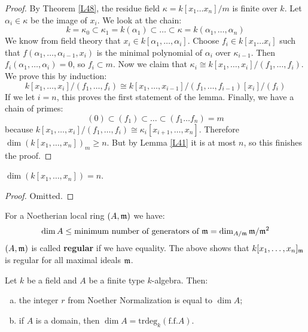 \documentclass{../mathnotes}
\begin{document}
\begin{proof}
By Theorem \ref{L48}, the residue field $\kappa = k[x_1 \dots x_n]/m$ is finite over $k$. Let $\alpha_i \in \kappa$ be the image of $x_i$. We look at the chain:
\[        k = \kappa_0 \subset \kappa_1 = k(\alpha_1) \subset \dots \subset \kappa = k(\alpha_1, \dots , \alpha_n)        \]
We know from field theory that $x_i \in k[\alpha_1, \dots, \alpha_i]$. Choose $f_i \in k[x_1 \dots x_i]$ such that $f(\alpha_1, \dots, \alpha_{i-1}, x_i)$ is the minimal polynomial of $\alpha_i$ over $\kappa_{i-1}$. Then $f_i(\alpha_1, \dots, \alpha_i) = 0$, so $f_i \subset m$. Now we claim that $\kappa_i \cong k[x_1, \dots, x_i]/(f_1, \dots, f_i)$. We prove this by induction:
\[       k[x_1, \dots, x_i]/(f_1, \dots, f_i)   \cong k[x_1, \dots, x_{i-1}]/(f_1, \dots, f_{i-1}) [x_i] /(f_i)        \]
If we let $i=n$, this proves the first statement of the lemma. Finally, we have a chain of primes:
\[      (0) \subset (f_1) \subset \dots \subset (f_1 \dots f_n) = m        \]
because $ k[x_1, \dots, x_i]/(f_1, \dots, f_i) \cong \kappa_i [x_{i+1}, \dots, x_n]$. Therefore $\dim(k[x_1, \dots, x_{n}])_m \geq n$. But by Lemma \ref{L41} it is at most $n$, so this finishes the proof.
\end{proof}

\begin{lem}
\label{L53}
$\dim(k[x_1, \dots, x_n]) = n$.
\end{lem}
\begin{proof}
Omitted.
\end{proof}

\begin{rem}
For a Noetherian local ring $(A,\mathfrak m)$ we have:
\[  \dim A \leq \text{minimum number of generators of } \mathfrak m = \dim_{A/\mathfrak m} \mathfrak m/\mathfrak m^2 \]
$(A,\mathfrak m)$ is called \textbf{regular} if we have equality. The above shows that $k[x_1, \dots, x_n]_\mathfrak m$ is regular for all maximal ideals $\mathfrak m$.
\end{rem}

\begin{lem}
\label{L54}
Let $k$ be a field and $A$ be a finite type $k$-algebra. Then:
\begin{enumerate} [(a)]
\item the integer $r$ from Noether Normalization is equal to $\dim A$;
\item if $A$ is a domain, then $\dim A = \text{trdeg}_k (\text{f.f.} A)$.
\end{enumerate}
\end{lem}
\end{document}
